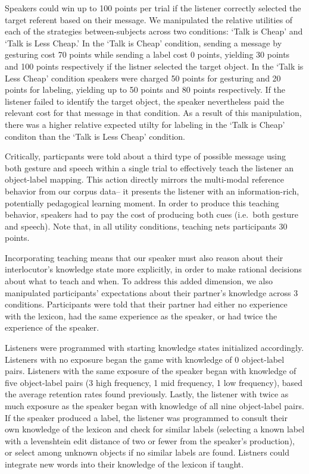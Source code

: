 \documentclass[10pt, letterpaper]{article}
\begin{document}
Speakers could win up to 100 points per trial if the listener correctly
selected the target referent based on their message. We manipulated the
relative utilities of each of the strategies between-subjects across two
conditions: `Talk is Cheap' and `Talk is Less Cheap.' In the `Talk is
Cheap' condition, sending a message by gesturing cost 70 points while
sending a label cost 0 points, yielding 30 points and 100 points
respectively if the listner selected the target object. In the `Talk is
Less Cheap' condition speakers were charged 50 points for gesturing and
20 points for labeling, yielding up to 50 points and 80 points
respectively. If the listener failed to identify the target object, the
speaker nevertheless paid the relevant cost for that message in that
condition. As a result of this manipulation, there was a higher relative
expected utilty for labeling in the `Talk is Cheap' conditon than the
`Talk is Less Cheap' condition.

Critically, particpants were told about a third type of possible message
using both gesture and speech within a single trial to effectively teach
the listener an object-label mapping. This action directly mirrors the
multi-modal reference behavior from our corpus data-- it presents the
listener with an information-rich, potentially pedagogical learning
moment. In order to produce this teaching behavior, speakers had to pay
the cost of producing both cues (i.e.~both gesture and speech). Note
that, in all utility conditions, teaching nets participants 30 points.

Incorporating teaching means that our speaker must also reason about
their interlocutor's knowledge state more explicitly, in order to make
rational decisions about what to teach and when. To address this added
dimension, we also manipulated participants' expectations about their
partner's knowledge across 3 conditions. Participants were told that
their partner had either no experience with the lexicon, had the same
experience as the speaker, or had twice the experience of the speaker.

Listeners were programmed with starting knowledge states initialized
accordingly. Listeners with no exposure began the game with knowledge of
0 object-label pairs. Listeners with the same exposure of the speaker
began with knowledge of five object-label pairs (3 high frequency, 1 mid
frequency, 1 low frequency), based the average retention rates found
previously. Lastly, the listener with twice as much exposure as the
speaker began with knowledge of all nine object-label pairs. If the
speaker produced a label, the listener was programmed to consult their
own knowledge of the lexicon and check for similar labels (selecting a
known label with a levenshtein edit distance of two or fewer from the
speaker's production), or select among unknown objects if no similar
labels are found. Listners could integrate new words into their
knowledge of the lexicon if taught.
\end{document}
